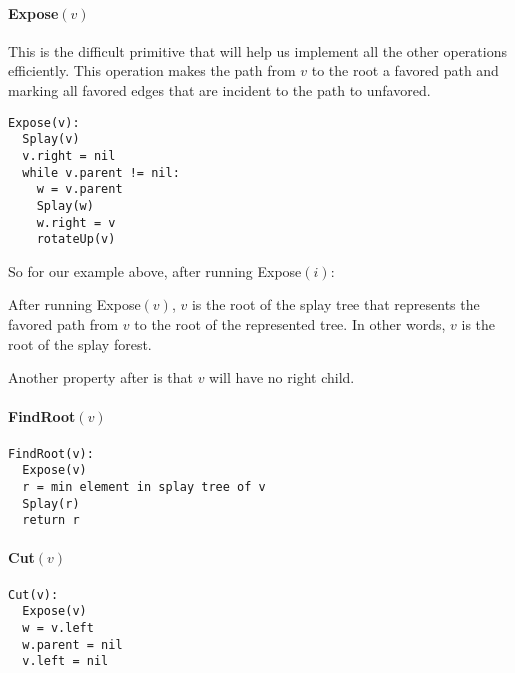 \documentclass[a4paper]{article}
\begin{document}
\paragraph{Expose$(v)$}
This is the difficult primitive that will help us implement all the other operations efficiently. This operation makes the path from $v$ to the root a favored path and marking all favored edges that are incident to the path to unfavored.

\begin{lstlisting}[frame=L]
Expose(v):
  Splay(v)
  v.right = nil
  while v.parent != nil:
    w = v.parent
    Splay(w)
    w.right = v
    rotateUp(v)
\end{lstlisting}

So for our example above, after running Expose$(i)$:


After running Expose$(v)$, $v$ is the root of the splay tree that represents the favored path from $v$ to the root of the represented tree. In other words, $v$ is the root of the splay forest.

Another property after is that $v$ will have no right child.

\paragraph{FindRoot$(v)$}
\begin{lstlisting}[frame=L]
FindRoot(v):
  Expose(v)
  r = min element in splay tree of v
  Splay(r)
  return r
\end{lstlisting}

\paragraph{Cut$(v)$}
\begin{lstlisting}[frame=L]
Cut(v):
  Expose(v)
  w = v.left
  w.parent = nil
  v.left = nil
\end{lstlisting}
\end{document}
